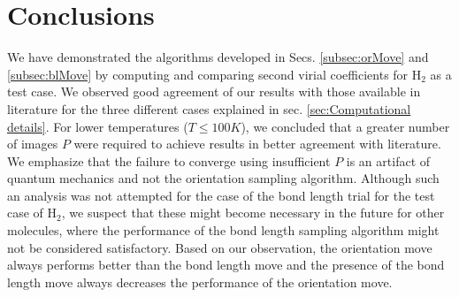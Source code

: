     \section{Conclusions}
        \label{sec:Conclusions and future work}
        We have demonstrated the algorithms developed in Secs. \ref{subsec:orMove} and \ref{subsec:blMove} by computing and comparing second virial coefficients for H$_2$ as a test case. We observed good agreement of our results with those available in literature for the three different cases explained in sec. \ref{sec:Computational details}. For lower temperatures ($T \le 100 K$), we concluded that a greater number of images $P$ were required to achieve results in better agreement with literature. We emphasize that the failure to converge using insufficient $P$ is an artifact of quantum mechanics and not the orientation sampling algorithm. Although such an analysis was not attempted for the case of the bond length trial for the test case of H$_2$, we suspect that these might become necessary in the future for other molecules, where the performance of the bond length sampling algorithm might not be considered satisfactory. Based on our observation, the orientation move always performs better than the bond length move and the presence of the bond length move always decreases the performance of the orientation move.
